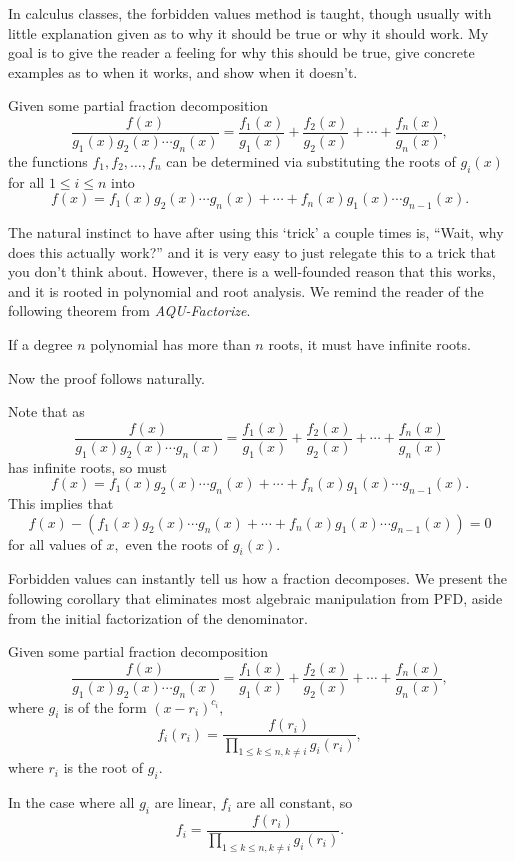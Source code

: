\documentclass[mast]{lucky}
\begin{document}
In calculus classes, the forbidden values method is taught, though usually with little explanation given as to why it should be true or why it should work. My goal is to give the reader a feeling for why this should be true, give concrete examples as to when it works, and show when it doesn't.

\begin{theo}
Given some partial fraction decomposition
\[\frac{f(x)}{g_1(x)g_2(x)\cdots g_n(x)}=\frac{f_1(x)}{g_1(x)}+\frac{f_2(x)}{g_2(x)}+\cdots+\frac{f_n(x)}{g_n(x)},\]
the functions $f_1,f_2,\ldots, f_n$ can be determined via substituting the roots of $g_i(x)$ for all $1\leq i\leq n$ into
\[f(x)=f_1(x)g_2(x)\cdots g_n(x)+\cdots+f_n(x)g_1(x)\cdots g_{n-1}(x).\]
\end{theo}

The natural instinct to have after using this `trick' a couple times is, ``Wait, why does this actually work?'' and it is very easy to just relegate this to a trick that you don't think about. However, there is a well-founded reason that this works, and it is rooted in polynomial and root analysis. We remind the reader of the following theorem from \emph{AQU-Factorize}.

\begin{theo}
If a degree $n$ polynomial has more than $n$ roots, it must have infinite roots.
\end{theo}

Now the proof follows naturally.

\begin{pro}
Note that as
\[\frac{f(x)}{g_1(x)g_2(x)\cdots g_n(x)}=\frac{f_1(x)}{g_1(x)}+\frac{f_2(x)}{g_2(x)}+\cdots+\frac{f_n(x)}{g_n(x)}\]
has infinite roots, so must 
\[f(x)=f_1(x)g_2(x)\cdots g_n(x)+\cdots+f_n(x)g_1(x)\cdots g_{n-1}(x).\]
This implies that
\[f(x)-(f_1(x)g_2(x)\cdots g_n(x)+\cdots+f_n(x)g_1(x)\cdots g_{n-1}(x))=0\]
for all values of $x,$ even the roots of $g_i(x).$
\end{pro}

Forbidden values can instantly tell us how a fraction decomposes. We present the following corollary that eliminates most algebraic manipulation from PFD, aside from the initial factorization of the denominator.

\begin{theo}
Given some partial fraction decomposition
\[\frac{f(x)}{g_1(x)g_2(x)\cdots g_n(x)}=\frac{f_1(x)}{g_1(x)}+\frac{f_2(x)}{g_2(x)}+\cdots+\frac{f_n(x)}{g_n(x)},\] where $g_i$ is of the form $(x-r_i)^{c_i},$
\[f_i(r_i)=\frac{f(r_i)}{\prod\limits_{1\leq k\leq n, k\neq i}g_i(r_i)},\] where $r_i$ is the root of $g_i.$

In the case where all $g_i$ are linear, $f_i$ are all constant, so \[f_i=\frac{f(r_i)}{\prod\limits_{1\leq k\leq n,k\neq i}g_i(r_i)}.\]
\end{theo}
\end{document}
